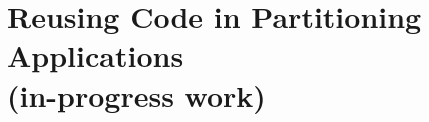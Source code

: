 \declarecommand{\sysname}{\civet{}}

\chapter{Reusing Code in Partitioning Applications\\ (in-progress work)}
\label{chap:civet}







%

